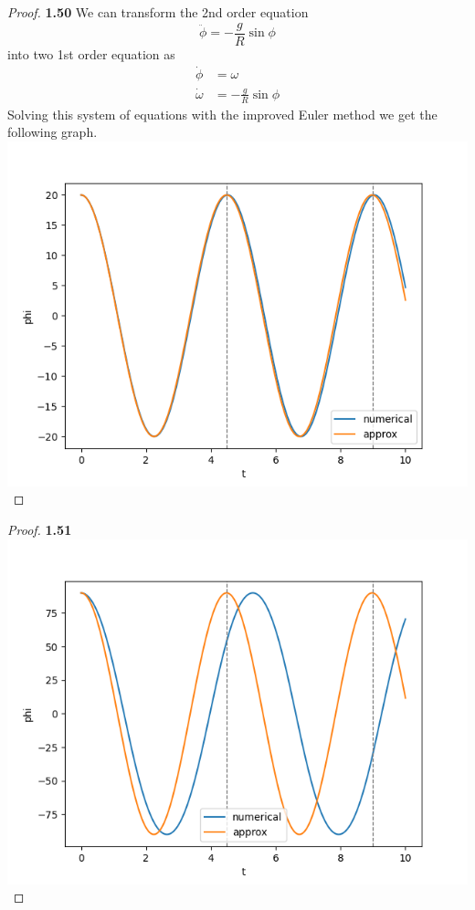 \documentclass[11pt]{article}
\begin{document}
    \begin{proof}{\textbf{1.50}}
        We can transform the 2nd order equation
        $$\ddot{\phi} = - \frac{g}{R}\sin{\phi}$$
        into two 1st order equation as
        \begin{align*}
            \dot{\phi} &= \omega \\
            \dot{\omega} &=  - \frac{g}{R}\sin{\phi}
        \end{align*}
        Solving this system of equations with the improved Euler method we get
        the following graph.\\
        \includegraphics{taylor-1.50.png}
    \end{proof}
\cleardoublepage
    \begin{proof}{\textbf{1.51}}\\
        \includegraphics{taylor-1.51.png}   
    \end{proof}
\end{document}
